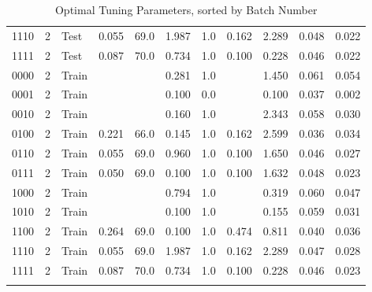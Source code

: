 \begin{longtable}{lllrrrrrrrr}
   1110 &       2 &  Test &    0.055 & 69.0 &     1.987 & 1.0 & 0.162 &          2.289 & 0.048 & 0.022 \\
   1111 &       2 &  Test &    0.087 & 70.0 &     0.734 & 1.0 & 0.100 &          0.228 & 0.046 & 0.022 \\
   0000 &       2 &   Train &       &     &     0.281 & 1.0 &    &          1.450 & 0.061 & 0.054 \\
   0001 &       2 &   Train &       &     &     0.100 & 0.0 &    &          0.100 & 0.037 & 0.002 \\
   0010 &       2 &   Train &       &     &     0.160 & 1.0 &    &          2.343 & 0.058 & 0.030 \\
   0100 &       2 &   Train &    0.221 & 66.0 &     0.145 & 1.0 & 0.162 &          2.599 & 0.036 & 0.034 \\
   0110 &       2 &   Train &    0.055 & 69.0 &     0.960 & 1.0 & 0.100 &          1.650 & 0.046 & 0.027 \\
   0111 &       2 &   Train &    0.050 & 69.0 &     0.100 & 1.0 & 0.100 &          1.632 & 0.048 & 0.023 \\
   1000 &       2 &   Train &       &     &     0.794 & 1.0 &    &          0.319 & 0.060 & 0.047 \\
   1010 &       2 &   Train &       &     &     0.100 & 1.0 &    &          0.155 & 0.059 & 0.031 \\
   1100 &       2 &   Train &    0.264 & 69.0 &     0.100 & 1.0 & 0.474 &          0.811 & 0.040 & 0.036 \\
   1110 &       2 &   Train &    0.055 & 69.0 &     1.987 & 1.0 & 0.162 &          2.289 & 0.047 & 0.028 \\
   1111 &       2 &   Train &    0.087 & 70.0 &     0.734 & 1.0 & 0.100 &          0.228 & 0.046 & 0.023 \\
   \caption{Optimal Tuning Parameters, sorted by Batch Number}
\end{longtable}
\endgroup